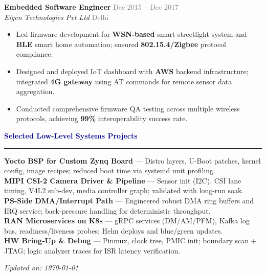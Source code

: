 \documentclass[11pt,a4paper]{article}
\newcommand{\ressection}[1]{\vspace{8pt}\textcolor{darkblue}{\textbf{\large #1}}\hrule\vspace{4pt}}
\newcommand{\ressubsection}[4]{\textbf{#1} \hfill \textcolor{gray}{#2} \\ \textit{#3} \hfill \textcolor{gray}{#4}}
\begin{document}
\ressubsection{Embedded Software Engineer}{Dec 2015 -- Dec 2017}{Eigen Technologies Pvt Ltd}{Delhi}
\begin{itemize}[leftmargin=15pt,topsep=2pt,itemsep=1pt]
\item Led firmware development for \textbf{WSN-based} smart streetlight system and \textbf{BLE} smart home automation; ensured \textbf{802.15.4/Zigbee} protocol compliance.
\item Designed and deployed IoT dashboard with \textbf{AWS} backend infrastructure; integrated \textbf{4G gateway} using AT commands for remote sensor data aggregation.
\item Conducted comprehensive firmware QA testing across multiple wireless protocols, achieving \textbf{99\%} interoperability success rate.
\end{itemize}

\ressection{Selected Low-Level Systems Projects}
\textbf{Yocto BSP for Custom Zynq Board} — Distro layers, U-Boot patches, kernel config, image recipes; reduced boot time via systemd unit profiling.\\[2pt]
\textbf{MIPI CSI-2 Camera Driver \& Pipeline} — Sensor init (I2C), CSI lane timing, V4L2 sub-dev, media controller graph; validated with long-run soak.\\[2pt]
\textbf{PS-Side DMA/Interrupt Path} — Engineered robust DMA ring buffers and IRQ service; back-pressure handling for deterministic throughput.\\[2pt]
\textbf{RAN Microservices on K8s} — gRPC services (DM/AM/PFM), Kafka log bus, readiness/liveness probes; Helm deploys and blue/green updates.\\[2pt]
\textbf{HW Bring-Up \& Debug} — Pinmux, clock tree, PMIC init; boundary scan + JTAG; logic analyzer traces for ISR latency verification.

\vspace{8pt}
\begin{center}
\textit{Updated on: \today}
\end{center}
\end{document}

